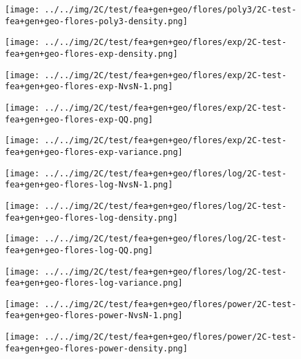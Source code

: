 \begin{figure}[H]
\centering	\texttt{[image: ../../img/2C/test/fea+gen+geo/flores/poly3/2C-test-fea+gen+geo-flores-poly3-density.png]}
\end{figure}
\begin{figure}[H]
\centering	\texttt{[image: ../../img/2C/test/fea+gen+geo/flores/exp/2C-test-fea+gen+geo-flores-exp-density.png]}
\end{figure}
\begin{figure}[H]
\centering	\texttt{[image: ../../img/2C/test/fea+gen+geo/flores/exp/2C-test-fea+gen+geo-flores-exp-NvsN-1.png]}
\end{figure}
\begin{figure}[H]
\centering	\texttt{[image: ../../img/2C/test/fea+gen+geo/flores/exp/2C-test-fea+gen+geo-flores-exp-QQ.png]}
\end{figure}
\begin{figure}[H]
\centering	\texttt{[image: ../../img/2C/test/fea+gen+geo/flores/exp/2C-test-fea+gen+geo-flores-exp-variance.png]}
\end{figure}
\begin{figure}[H]
\centering	\texttt{[image: ../../img/2C/test/fea+gen+geo/flores/log/2C-test-fea+gen+geo-flores-log-NvsN-1.png]}
\end{figure}
\begin{figure}[H]
\centering	\texttt{[image: ../../img/2C/test/fea+gen+geo/flores/log/2C-test-fea+gen+geo-flores-log-density.png]}
\end{figure}
\begin{figure}[H]
\centering	\texttt{[image: ../../img/2C/test/fea+gen+geo/flores/log/2C-test-fea+gen+geo-flores-log-QQ.png]}
\end{figure}
\begin{figure}[H]
\centering	\texttt{[image: ../../img/2C/test/fea+gen+geo/flores/log/2C-test-fea+gen+geo-flores-log-variance.png]}
\end{figure}
\begin{figure}[H]
\centering	\texttt{[image: ../../img/2C/test/fea+gen+geo/flores/power/2C-test-fea+gen+geo-flores-power-NvsN-1.png]}
\end{figure}
\begin{figure}[H]
\centering	\texttt{[image: ../../img/2C/test/fea+gen+geo/flores/power/2C-test-fea+gen+geo-flores-power-density.png]}
\end{figure}
